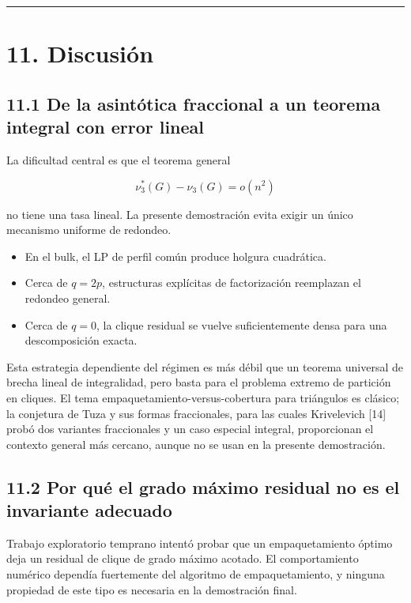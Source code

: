 \documentclass[
  spanish,
  11pt,
  a4paper,
]{article}
\providecommand{\tightlist}{%
  \setlength{\itemsep}{0pt}\setlength{\parskip}{0pt}}
\begin{document}
\begin{center}\rule{0.5\linewidth}{0.5pt}\end{center}

\section{11. Discusión}\label{discusiuxf3n}

\subsection{11.1 De la asintótica fraccional a un teorema integral con error lineal}\label{de-la-asintuxf3tica-fraccional-a-un-teorema-integral-con-error-lineal}

La dificultad central es que el teorema general

\[
\nu_3^*(G)-\nu_3(G)=o(n^2)
\]

no tiene una tasa lineal. La presente demostración evita exigir un único mecanismo uniforme de redondeo.

\begin{itemize}
\tightlist
\item
  En el bulk, el LP de perfil común produce holgura cuadrática.
\item
  Cerca de \(q=2p\), estructuras explícitas de factorización reemplazan el redondeo general.
\item
  Cerca de \(q=0\), la clique residual se vuelve suficientemente densa para una descomposición exacta.
\end{itemize}

Esta estrategia dependiente del régimen es más débil que un teorema universal de brecha lineal de integralidad, pero basta para el problema extremo de partición en cliques. El tema empaquetamiento-versus-cobertura para triángulos es clásico; la conjetura de Tuza y sus formas fraccionales, para las cuales Krivelevich {[}14{]} probó dos variantes fraccionales y un caso especial integral, proporcionan el contexto general más cercano, aunque no se usan en la presente demostración.

\subsection{11.2 Por qué el grado máximo residual no es el invariante adecuado}\label{por-quuxe9-el-grado-muxe1ximo-residual-no-es-el-invariante-adecuado}

Trabajo exploratorio temprano intentó probar que un empaquetamiento óptimo deja un residual de clique de grado máximo acotado. El comportamiento numérico dependía fuertemente del algoritmo de empaquetamiento, y ninguna propiedad de este tipo es necesaria en la demostración final.
\end{document}

